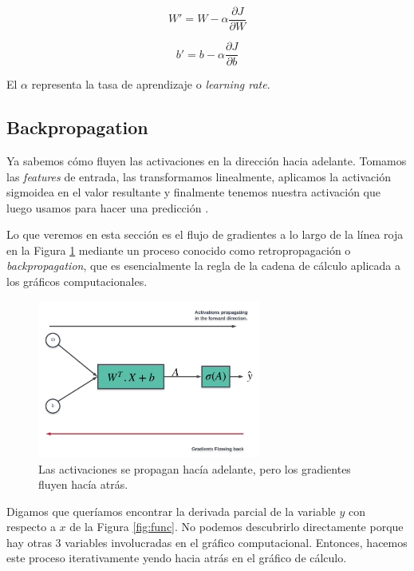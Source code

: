 \documentclass[a4paper,12pt]{article}
\begin{document}
\begin{equation}
W' = W - \alpha \frac{\partial J}{\partial W}
\end{equation}

\begin{equation}
b' = b - \alpha \frac{\partial J}{\partial b}
\end{equation}

El $\alpha$ representa la tasa de aprendizaje o  \textit{learning rate}.

\subsection{Backpropagation}

Ya sabemos cómo fluyen las activaciones en la dirección hacia adelante. Tomamos las \textit{features} de entrada, las transformamos linealmente, aplicamos la activación sigmoidea en el valor resultante y finalmente tenemos nuestra activación que luego usamos para hacer una predicción \citep{sgd}.

Lo que veremos en esta sección es el flujo de gradientes a lo largo de la línea roja en la Figura \ref{fig:back} mediante un proceso conocido como retropropagación o \textit{backpropagation}, que es esencialmente la regla de la cadena de cálculo aplicada a los gráficos computacionales.

\begin{figure}[H]
	\begin{center}				
	\includegraphics[width=0.65\textwidth]{024.png}
  	\caption{Las activaciones se propagan hacía adelante, pero los gradientes fluyen hacía atrás.}
  	\label{fig:back}
  	\end{center}
\end{figure}

Digamos que queríamos encontrar la derivada parcial de la variable $y$ con respecto a $x$ de la Figura \ref{fig:func}. No podemos descubrirlo directamente porque hay otras 3 variables involucradas en el gráfico computacional. Entonces, hacemos este proceso iterativamente yendo hacia atrás en el gráfico de cálculo.
\end{document}
